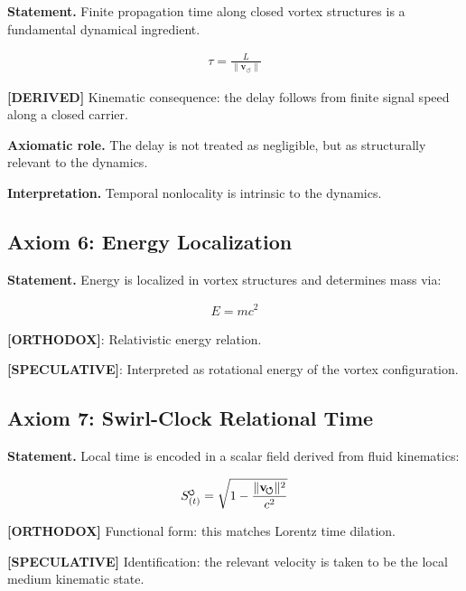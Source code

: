 \documentclass[11pt]{article}
\theoremstyle{definition}
\theoremstyle{plain}
\theoremstyle{remark}
\newcommand{\swirlarrow}{\mathchoice{\mkern-2mu\scriptstyle\boldsymbol{\circlearrowleft}}{\mkern-2mu\scriptstyle\boldsymbol{\circlearrowleft}}{\mkern-2mu\scriptscriptstyle\boldsymbol{\circlearrowleft}}{\mkern-2mu\scriptscriptstyle\boldsymbol{\circlearrowleft}}}
\newcommand{\SwirlClock}{{S_{(t)}^{\swirlarrow}}}
\newcommand{\vnorm}{\lVert \mathbf{v}_{\!\boldsymbol{\circlearrowleft}} \rVert}
\begin{document}
        \textbf{Statement.}
        Finite propagation time along closed vortex structures is a fundamental dynamical ingredient.
        
        \begin{align}
            \tau = \frac{L}{\vnorm}
        \end{align}
        
        \textbf{[DERIVED]} Kinematic consequence: the delay follows from finite signal speed along a closed carrier.

        \textbf{Axiomatic role.} The delay is not treated as negligible, but as structurally relevant to the dynamics.
        
        \textbf{Interpretation.}
        Temporal nonlocality is intrinsic to the dynamics.
    
    \subsection{Axiom 6: Energy Localization}
        
        \textbf{Statement.}
        Energy is localized in vortex structures and determines mass via:
        
        \begin{align}
            E = m c^2
        \end{align}
        
        \textbf{[ORTHODOX]}: Relativistic energy relation.
        
        \textbf{[SPECULATIVE]}: Interpreted as rotational energy of the vortex configuration.
    
    \subsection{Axiom 7: Swirl-Clock Relational Time}
        
        \textbf{Statement.}
        Local time is encoded in a scalar field derived from fluid kinematics:
        
        \begin{align}
            \SwirlClock = \sqrt{1 - \frac{\vnorm^2}{c^2}}
        \end{align}
        
        \textbf{[ORTHODOX]} Functional form: this matches Lorentz time dilation.

        \textbf{[SPECULATIVE]} Identification: the relevant velocity is taken to be the local medium kinematic state.
\end{document}
